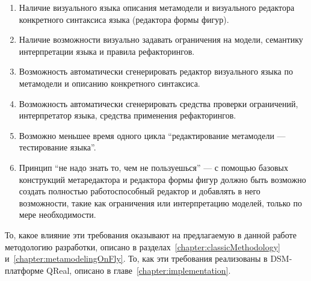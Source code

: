 \begin{enumerate}
	\item Наличие визуального языка описания метамодели и визуального редактора конкретного 
		синтаксиса языка (редактора формы фигур).
	\item Наличие возможности визуально задавать ограничения на модели, семантику интерпретации 
		языка и правила рефакторингов.
	\item Возможность автоматически сгенерировать редактор визуального языка по метамодели 
		и описанию конкретного синтаксиса.
	\item Возможность автоматически сгенерировать средства проверки ограничений, интерпретатор 
		языка, средства применения рефакторингов.
	\item Возможно меньшее время одного цикла "`редактирование метамодели --- тестирование языка"'.
	\item Принцип "`не надо знать то, чем не пользуешься"' --- с помощью базовых конструкций 
		метаредактора и редактора формы фигур должно быть возможно создать полностью работоспособный 
		редактор и добавлять в него возможности, такие как ограничения или интерпретацию моделей, 
		только по мере необходимости.
\end{enumerate}

То, какое влияние эти требования оказывают на предлагаемую в данной работе методологию 
разработки, описано в разделах~\ref{chapter:classicMethodology} и~\ref{chapter:metamodelingOnFly}. 
То, как эти требования реализованы в DSM-платформе QReal, описано в главе~\ref{chapter:implementation}.

